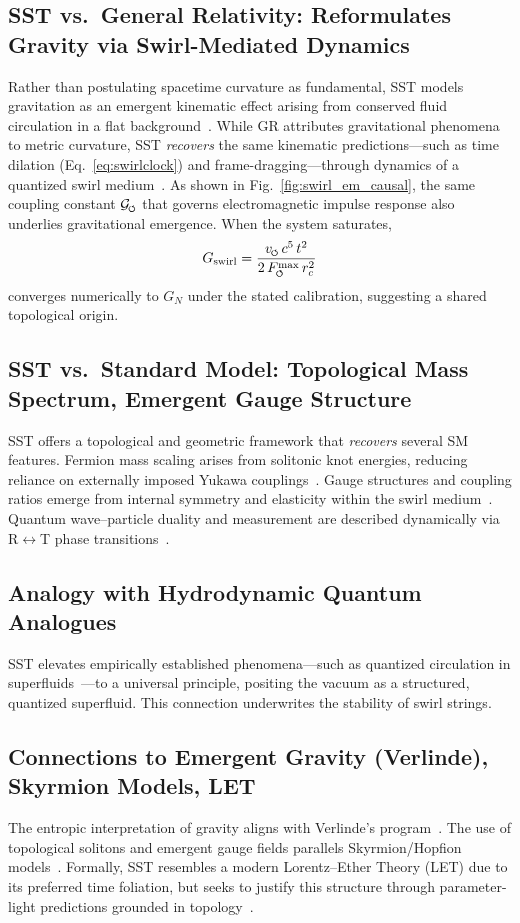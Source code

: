\documentclass[10pt,reprint,aps,onecolumn,nofootinbib]{revtex4-2}
\newcommand{\Fmaxswirl}{F^{\max}_{\mkern-1mu\scriptscriptstyle\boldsymbol{\circlearrowleft}}}
\begin{document}
\subsection*{SST vs.\ General Relativity: Reformulates Gravity via Swirl-Mediated Dynamics}
    Rather than postulating spacetime curvature as fundamental, SST models gravitation as an emergent kinematic effect arising from conserved fluid circulation in a flat background~\cite{3}. While GR attributes gravitational phenomena to metric curvature, SST \emph{recovers} the same kinematic predictions—such as time dilation (Eq.~\ref{eq:swirlclock}) and frame-dragging—through dynamics of a quantized swirl medium~\cite{1}. As shown in Fig.~\ref{fig:swirl_em_causal}, the same coupling constant \(\mathcal{G}_{\mkern-2mu\scriptscriptstyle\boldsymbol{\circlearrowleft}}\) that governs electromagnetic impulse response also underlies gravitational emergence. When the system saturates,
    \[
        G_{\mathrm{swirl}} = \frac{v_{\mkern-2mu\scriptscriptstyle\boldsymbol{\circlearrowleft}} \, c^5 \, t^2}{2 \, \Fmaxswirl \, r_c^2}
    \]
    converges numerically to \(G_N\) under the stated calibration, suggesting a shared topological origin.

\subsection*{SST vs.\ Standard Model: Topological Mass Spectrum, Emergent Gauge Structure}
    SST offers a topological and geometric framework that \emph{recovers} several SM features. Fermion mass scaling arises from solitonic knot energies, reducing reliance on externally imposed Yukawa couplings~\cite{4}. Gauge structures and coupling ratios emerge from internal symmetry and elasticity within the swirl medium~\cite{4}. Quantum wave–particle duality and measurement are described dynamically via R$\leftrightarrow$T phase transitions~\cite{1}.

\subsection*{Analogy with Hydrodynamic Quantum Analogues}
    SST elevates empirically established phenomena—such as quantized circulation in superfluids~\cite{1}—to a universal principle, positing the vacuum as a structured, quantized superfluid. This connection underwrites the stability of swirl strings.

\subsection*{Connections to Emergent Gravity (Verlinde), Skyrmion Models, LET}
    The entropic interpretation of gravity aligns with Verlinde’s program~\cite{3,7,8,18}. The use of topological solitons and emergent gauge fields parallels Skyrmion/Hopfion models~\cite{4,15,16}. Formally, SST resembles a modern Lorentz–Ether Theory (LET) due to its preferred time foliation, but seeks to justify this structure through parameter-light predictions grounded in topology~\cite{4}.
\end{document}
